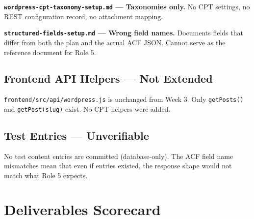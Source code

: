 \documentclass[12pt,a4paper]{article}
\begin{document}
\vspace{0.5em}
\noindent\textbf{\texttt{wordpress-cpt-taxonomy-setup.md} --- Taxonomies only.}
No CPT settings, no REST configuration record, no attachment mapping.

\vspace{0.5em}
\noindent\textbf{\texttt{structured-fields-setup.md} --- Wrong field names.}
Documents fields that differ from both the plan and the actual ACF JSON. Cannot serve as
the reference document for Role 5.

\subsection{Frontend API Helpers --- Not Extended}

\texttt{frontend/src/api/wordpress.js} is unchanged from Week 3. Only \texttt{getPosts()}
and \texttt{getPost(slug)} exist. No CPT helpers were added.

\subsection{Test Entries --- Unverifiable}

No test content entries are committed (database-only). The ACF field name mismatches mean
that even if entries existed, the response shape would not match what Role 5 expects.

\section{Deliverables Scorecard}
\end{document}
